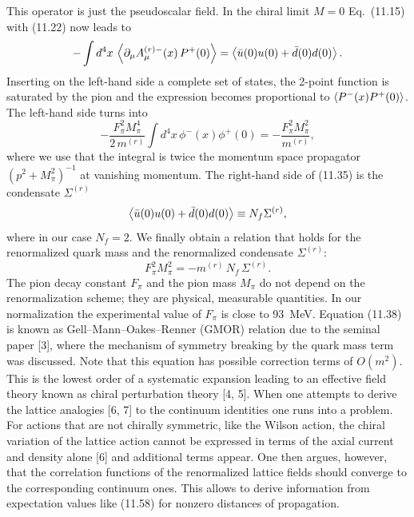This operator is just the pseudoscalar field. In the chiral limit $M = 0$ Eq.~(11.15) with (11.22) now leads to
\begin{equation}
-\int d^4x\, \left\langle \partial_\mu A_\mu^{(r)-}(x)\, P^+(0) \right\rangle
= \left\langle \bar{u}(0)u(0) + \bar{d}(0)d(0) \right\rangle .
\end{equation}
Inserting on the left-hand side a complete set of states, the 2-point function is saturated by the pion and the expression becomes proportional to
$\left\langle P^{-}(x)P^{+}(0) \right\rangle$. The left-hand side turns into
\begin{equation}
-\frac{F_\pi^2 M_\pi^4}{2\,m^{(r)}}\int d^4x\, \phi^-(x)\phi^+(0)
= -\frac{F_\pi^2 M_\pi^2}{m^{(r)}} ,
\end{equation}
where we use that the integral is twice the momentum space propagator $(p^2 +
M_\pi^2)^{-1}$ at vanishing momentum.
The right-hand side of (11.35) is the condensate $\Sigma^{(r)}$
\begin{equation}
\left\langle \bar{u}(0)u(0) + \bar{d}(0)d(0) \right\rangle \equiv N_f \Sigma^{(r)} ,
\end{equation}
where in our case $N_f = 2$.
We finally obtain a relation that holds for the renormalized quark mass
and the renormalized condensate $\Sigma^{(r)}$:
\begin{equation}
F_\pi^2 M_\pi^2 = -m^{(r)}\, N_f\, \Sigma^{(r)} .
\end{equation}
The pion decay constant $F_\pi$ and the pion mass $M_\pi$ do not depend on the
renormalization scheme; they are physical, measurable quantities. In our normalization the experimental value of $F_\pi$ is close to 93~MeV.
Equation (11.38) is known as Gell--Mann--Oakes--Renner (GMOR) relation
due to the seminal paper [3], where the mechanism of symmetry breaking by
the quark mass term was discussed. Note that this equation has possible
correction terms of $O(m^2)$. This is the lowest order of a systematic expansion
leading to an effective field theory known as chiral perturbation theory [4, 5].
When one attempts to derive the lattice analogies [6, 7] to the continuum
identities one runs into a problem. For actions that are not chirally symmetric,
like the Wilson action, the chiral variation of the lattice action cannot be
expressed in terms of the axial current and density alone [6] and additional
terms appear. One then argues, however, that the correlation functions of the
renormalized lattice fields should converge to the corresponding continuum
ones. This allows to derive information from expectation values like (11.58)
for nonzero distances of propagation.

